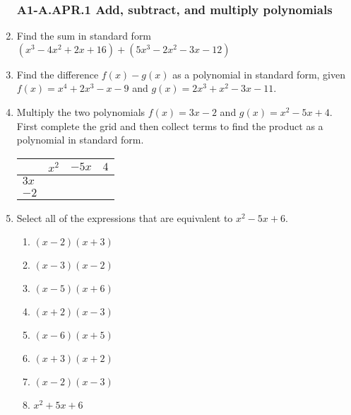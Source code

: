 \documentclass[12pt, twoside]{article}
\begin{document}
\begin{enumerate}
\newpage
\subsubsection*{A1-A.APR.1 Add, subtract, and multiply polynomials}

\item Find the sum in standard form $(x^3-4x^2+2x+16)+(5x^3-2x^2-3x-12)$ \vspace{2cm}

\item Find the difference $f(x)-g(x)$ as a polynomial in standard form, given \\[0.25cm]
    $f(x)=x^4+2x^3-x-9$ and $g(x)=2x^3+x^2-3x-11$. \vspace{4cm}

\item Multiply the two polynomials $f(x)=3x-2$ and $g(x)=x^2-5x+4$. First complete the grid and then collect terms to find the product as a polynomial in standard form. \\[0.25cm]
\begin{tabular}{|p{1cm}|p{3cm}|p{3cm}|p{3cm}|}
    \hline
     & $x^2$ & $-5x$ & $4$ \\
    \hline
    $3x$ &  & & \\[0.5cm]
    \hline
    $-2$ &  & & \\[0.5cm]
    \hline
\end{tabular} \vspace{4cm}

\item Select all of the expressions that are equivalent to $x^2-5x+6$.
    \begin{multicols}{2}
    \begin{enumerate}
        \item $(x-2)(x+3)$
        \item $(x-3)(x-2)$ 
        \item $(x-5)(x+6)$ 
        \item $(x+2)(x-3)$ 
        \item $(x-6)(x+5)$
        \item $(x+3)(x+2)$ 
        \item $(x-2)(x-3)$
        \item $x^2+5x+6$
    \end{enumerate} 
    \end{multicols}
    \vspace{0.25cm}

\newpage

\end{enumerate}
\end{document}
